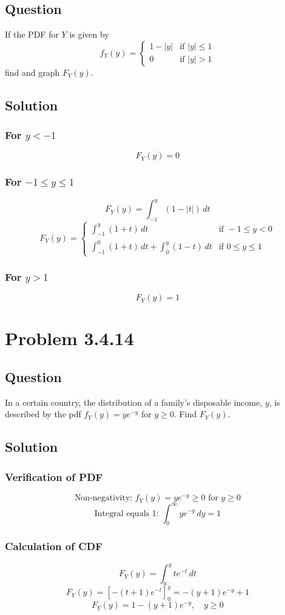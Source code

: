 \documentclass[12pt]{article}
\begin{document}
\subsection*{Question}
If the PDF for \( Y \) is given by
\[ 
f_Y(y) = 
\begin{cases} 
1 - |y| & \text{if } |y| \leq 1 \\
0 & \text{if } |y| > 1 
\end{cases}
\]
find and graph \( F_Y(y) \).

\subsection*{Solution}
\subsubsection*{For \( y < -1 \)}
\[
F_Y(y) = 0
\]
\subsubsection*{For \( -1 \leq y \leq 1 \)}
\[
F_Y(y) = \int_{-1}^y (1 - |t|) \, dt
\]
\[
F_Y(y) = 
\begin{cases} 
\int_{-1}^y (1 + t) \, dt & \text{if } -1 \leq y < 0 \\
\int_{-1}^0 (1 + t) \, dt + \int_0^y (1 - t) \, dt & \text{if } 0 \leq y \leq 1 
\end{cases}
\]
\subsubsection*{For \( y > 1 \)}
\[
F_Y(y) = 1
\]

\newpage
\section*{Problem 3.4.14}
\subsection*{Question}
In a certain country, the distribution of a family's disposable income, \( y \), is described by the pdf \( f_Y(y) = ye^{-y} \) for \( y \geq 0 \). Find \( F_Y(y) \).

\subsection*{Solution}
\subsubsection*{Verification of PDF}
\[
\text{Non-negativity: } f_Y(y) = ye^{-y} \geq 0 \text{ for } y \geq 0
\]
\[
\text{Integral equals 1: } \int_{0}^{\infty} ye^{-y} \, dy = 1
\]
\subsubsection*{Calculation of CDF}
\[
F_Y(y) = \int_{0}^{y} te^{-t} \, dt
\]
\[
F_Y(y) = [-(t+1)e^{-t}]_{0}^{y} = -(y+1)e^{-y} + 1
\]
\[
F_Y(y) = 1 - (y+1)e^{-y}, \quad y \geq 0
\]
\end{document}
